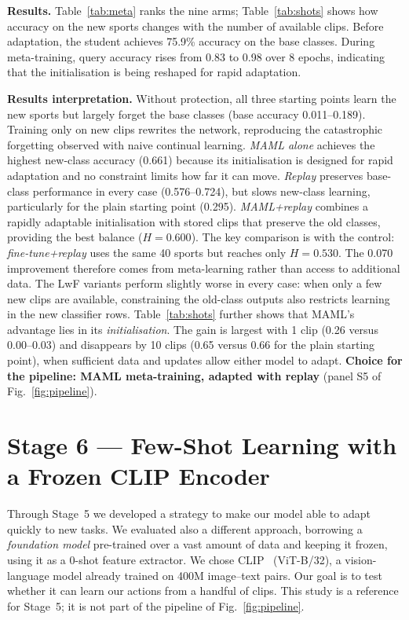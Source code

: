 \documentclass[conference]{IEEEtran}
\begin{document}
\textbf{Results.} Table~\ref{tab:meta} ranks the nine arms; Table~\ref{tab:shots} shows how
accuracy on the new sports changes with the number of available clips. Before adaptation,
the student achieves 75.9\% accuracy on the base classes. During meta-training, query
accuracy rises from 0.83 to 0.98 over 8 epochs, indicating that the initialisation is being
reshaped for rapid adaptation.

\textbf{Results interpretation.} Without protection, all three starting points learn the
new sports but largely forget the base classes (base accuracy 0.011--0.189). Training only
on new clips rewrites the network, reproducing the catastrophic forgetting observed with
naive continual learning. \emph{MAML alone} achieves the highest new-class accuracy
(0.661) because its initialisation is designed for rapid adaptation and no constraint
limits how far it can move. \emph{Replay} preserves base-class performance in every case
(0.576--0.724), but slows new-class learning, particularly for the plain starting point
(0.295). \emph{MAML+replay} combines a rapidly adaptable initialisation with stored clips
that preserve the old classes, providing the best balance ($H=0.600$). The key comparison
is with the control: \emph{fine-tune+replay} uses the same 40 sports but reaches only
$H=0.530$. The 0.070 improvement therefore comes from meta-learning rather than access to
additional data. The LwF variants perform slightly worse in every case: when only a few
new clips are available, constraining the old-class outputs also restricts learning in the
new classifier rows. Table~\ref{tab:shots} further shows that MAML's advantage lies in its
\emph{initialisation}. The gain is largest with 1 clip (0.26 versus 0.00--0.03) and
disappears by 10 clips (0.65 versus 0.66 for the plain starting point), when sufficient
data and updates allow either model to adapt.
\textbf{Choice for the pipeline: MAML meta-training, adapted with replay} (panel S5 of
Fig.~\ref{fig:pipeline}).

\section{Stage 6 --- Few-Shot Learning with a Frozen CLIP Encoder}
\label{sec:clip}
Through Stage~5 we developed a strategy to make our model able to adapt quickly to new tasks. We evaluated also a different approach, borrowing a \emph{foundation model} pre-trained over a vast amount of data and keeping it frozen, using it as a 0-shot feature extractor.
We chose CLIP~\cite{radford2021clip} (ViT-B/32), a vision-language model already trained on 400M image--text pairs.
Our goal is to test whether it can learn our actions from a handful of clips. This study
is a reference for Stage~5; it is not part of the pipeline of Fig.~\ref{fig:pipeline}.
\end{document}
